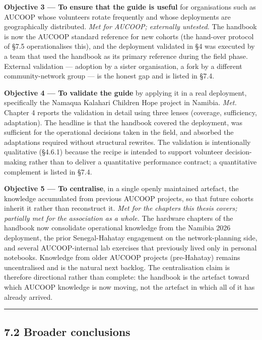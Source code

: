 \textbf{Objective 3 --- To ensure that the guide is useful} for
organisations such as AUCOOP whose volunteers rotate frequently and
whose deployments are geographically distributed. \emph{Met for AUCOOP;
externally untested.} The handbook is now the AUCOOP standard reference
for new cohorts (the hand-over protocol of §7.5 operationalises this),
and the deployment validated in §4 was executed by a team that used the
handbook as its primary reference during the field phase. External
validation --- adoption by a sister organisation, a fork by a different
community-network group --- is the honest gap and is listed in §7.4.

\textbf{Objective 4 --- To validate the guide} by applying it in a real
deployment, specifically the Namaqua Kalahari Children Hope project in
Namibia. \emph{Met.} Chapter 4 reports the validation in detail using
three lenses (coverage, sufficiency, adaptation). The headline is that
the handbook covered the deployment, was sufficient for the operational
decisions taken in the field, and absorbed the adaptations required
without structural rewrites. The validation is intentionally qualitative
(§4.6.1) because the recipe is intended to support volunteer
decision-making rather than to deliver a quantitative performance
contract; a quantitative complement is listed in §7.4.

\textbf{Objective 5 --- To centralise}, in a single openly maintained
artefact, the knowledge accumulated from previous AUCOOP projects, so
that future cohorts inherit it rather than reconstruct it. \emph{Met for
the chapters this thesis covers; partially met for the association as a
whole.} The hardware chapters of the handbook now consolidate
operational knowledge from the Namibia 2026 deployment, the prior
Senegal-Hahatay engagement on the network-planning side, and several
AUCOOP-internal lab exercises that previously lived only in personal
notebooks. Knowledge from older AUCOOP projects (pre-Hahatay) remains
uncentralised and is the natural next backlog. The centralisation claim
is therefore directional rather than complete: the handbook is the
artefact toward which AUCOOP knowledge is now moving, not the artefact
in which all of it has already arrived.

\begin{center}\rule{0.5\linewidth}{0.5pt}\end{center}

\hypertarget{broader-conclusions}{%
\subsection{7.2 Broader conclusions}\label{broader-conclusions}}

